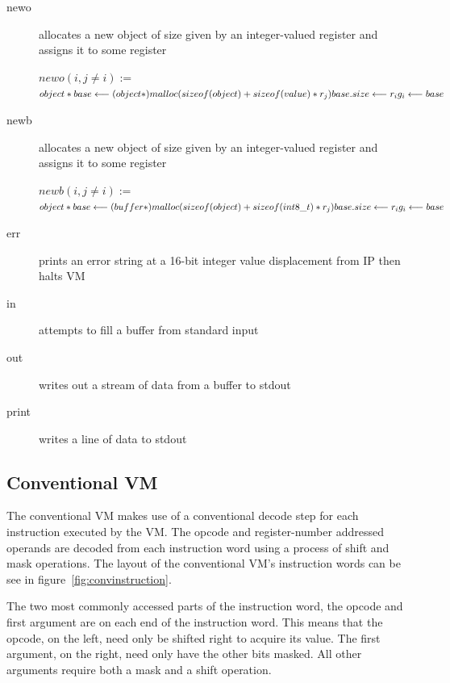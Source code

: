 \documentclass[english,a4paper]{article}
\begin{document}
\begin{description}
\item[newo] allocates a new object of size given by an integer-valued
  register and assigns it to some register

  $ newo(i, j \neq i) := $ \\
  $  object *base \longleftarrow (object*)malloc(sizeof(object) + sizeof(value)* r_j) \\
  base.size \longleftarrow r_i\\
  g_i \longleftarrow base \\ $

\item[newb]{} allocates a new object of size given by an
  integer-valued register and assigns it to some register

  $ newb(i, j \neq i) := $ \\
  $  object *base \longleftarrow (buffer*)malloc(sizeof(object) + sizeof(int8\_t)* r_j) \\
  base.size \longleftarrow r_i\\
  g_i \longleftarrow base \\ $

\item[err] prints an error string at a 16-bit integer value
  displacement from IP then halts VM


\item[in] attempts to fill a buffer from standard input

\item[out] writes out a stream of data from a buffer to stdout

\item[print] writes a line of data to stdout

\end{description}

\subsection{Conventional VM}

The conventional VM makes use of a conventional decode step for each
instruction executed by the VM. The opcode and register-number
addressed operands are decoded from each instruction word using a
process of shift and mask operations. The layout of the conventional
VM's instruction words can be see in figure~\ref{fig:convinstruction}.

The two most commonly accessed parts of the instruction word, the
opcode and first argument are on each end of the instruction
word. This means that the opcode, on the left, need only be shifted
right to acquire its value. The first argument, on the right, need
only have the other bits masked. All other arguments require both a
mask and a shift operation.
\end{document}
